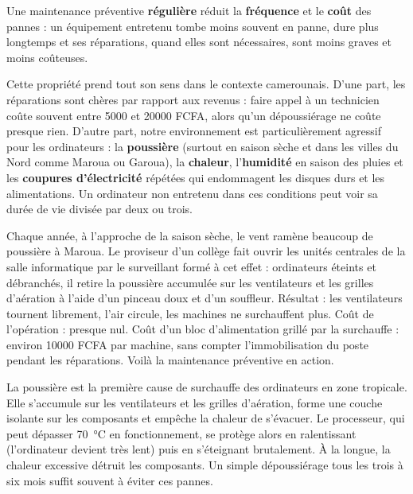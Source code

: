 \documentclass[11pt]{article}
\begin{document}
\begin{propriete}
Une maintenance préventive \textbf{régulière} réduit la \textbf{fréquence} et le \textbf{coût} des pannes : un équipement entretenu tombe moins souvent en panne, dure plus longtemps et ses réparations, quand elles sont nécessaires, sont moins graves et moins coûteuses.
\end{propriete}

Cette propriété prend tout son sens dans le contexte camerounais. D'une part, les réparations sont chères par rapport aux revenus : faire appel à un technicien coûte souvent entre \num{5000} et \num{20000} FCFA, alors qu'un dépoussiérage ne coûte presque rien. D'autre part, notre environnement est particulièrement agressif pour les ordinateurs : la \textbf{poussière} (surtout en saison sèche et dans les villes du Nord comme Maroua ou Garoua), la \textbf{chaleur}, l'\textbf{humidité} en saison des pluies et les \textbf{coupures d'électricité} répétées qui endommagent les disques durs et les alimentations. Un ordinateur non entretenu dans ces conditions peut voir sa durée de vie divisée par deux ou trois.

\begin{exemplebox}
Chaque année, à l'approche de la saison sèche, le vent ramène beaucoup de poussière à Maroua. Le proviseur d'un collège fait ouvrir les unités centrales de la salle informatique par le surveillant formé à cet effet : ordinateurs éteints et débranchés, il retire la poussière accumulée sur les ventilateurs et les grilles d'aération à l'aide d'un pinceau doux et d'un souffleur. Résultat : les ventilateurs tournent librement, l'air circule, les machines ne surchauffent plus. Coût de l'opération : presque nul. Coût d'un bloc d'alimentation grillé par la surchauffe : environ \num{10000} FCFA par machine, sans compter l'immobilisation du poste pendant les réparations. Voilà la maintenance préventive en action.
\end{exemplebox}

\begin{savaistu}
La poussière est la première cause de surchauffe des ordinateurs en zone tropicale. Elle s'accumule sur les ventilateurs et les grilles d'aération, forme une couche isolante sur les composants et empêche la chaleur de s'évacuer. Le processeur, qui peut dépasser \SI{70}{\celsius} en fonctionnement, se protège alors en ralentissant (l'ordinateur devient très lent) puis en s'éteignant brutalement. À la longue, la chaleur excessive détruit les composants. Un simple dépoussiérage tous les trois à six mois suffit souvent à éviter ces pannes.
\end{savaistu}
\end{document}
